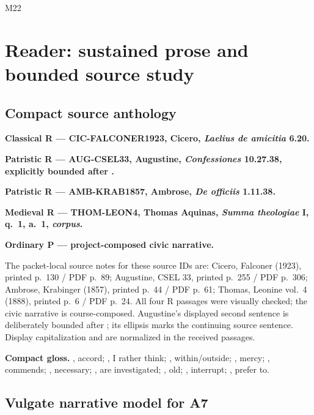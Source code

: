 \begin{courseunit}{M22}
\chapter{Reader: sustained prose and bounded source study}

\section{Compact source anthology}

\textbf{Classical R --- CIC-FALCONER1923, Cicero, \textit{Laelius de
amicitia} 6.20.}

\ReaderCiceroFriendship

\textbf{Patristic R --- AUG-CSEL33, Augustine, \textit{Confessiones}
10.27.38, explicitly bounded after .}

\ReaderAugustineLate

\textbf{Patristic R --- AMB-KRAB1857, Ambrose, \textit{De officiis}
1.11.38.}

\ReaderAmbroseMercy

\textbf{Medieval R --- THOM-LEON4, Thomas Aquinas, \textit{Summa theologiae}
I, q.~1, a.~1, \textit{corpus}.}

\ReaderThomasDoctrine

\textbf{Ordinary P --- project-composed civic narrative.}

\ReaderBridgeNarrative

The packet-local source notes for these source IDs are: Cicero, Falconer (1923),
printed p.~130 / PDF p.~89; Augustine, CSEL 33, printed p.~255 / PDF p.~306;
Ambrose, Krabinger (1857), printed p.~44 / PDF p.~61; Thomas, Leonine vol.~4
(1888), printed p.~6 / PDF p.~24.  All four R passages were visually checked;
the civic narrative is course-composed.  Augustine's displayed second sentence
is deliberately bounded after ; its ellipsis marks the
continuing source sentence.  Display capitalization and  are
normalized in the received passages.

\textbf{Compact gloss.} , accord; , I
rather think; , within/outside; , mercy;
, commends; , necessary;
, are investigated; , old;
, interrupt; , prefer to.

\section{Vulgate narrative model for A7}


\end{courseunit}
